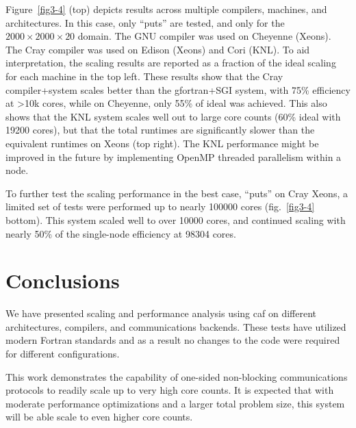 Figure~\ref{fig3-4} (top) depicts results across multiple compilers, machines, and architectures.
In this case, only ``puts'' are tested, and only for the $2000 \times 2000\times 20$ domain.
The GNU compiler was used on Cheyenne (Xeons). The Cray compiler was used on Edison (Xeons) and Cori (KNL).
To aid interpretation, the scaling results are reported as a fraction of the ideal scaling for each machine in the top left.
These results show that the Cray compiler+system scales better than the gfortran+SGI system,
with 75\% efficiency at >10k cores, while on Cheyenne, only 55\% of ideal was achieved.
This also shows that the KNL system scales well out to large core counts (60\% ideal with \num{19200} cores),
but that the total runtimes are significantly slower than the equivalent runtimes on Xeons (top right).
The KNL performance might be improved in the future by implementing OpenMP threaded parallelism within a node.

To further test the scaling performance in the best case, ``puts'' on Cray Xeons, a limited set of tests were performed up to nearly \num{100000} cores (fig.~\ref{fig3-4} bottom).
This system scaled well to over \num{10000} cores, and continued scaling with nearly 50\% of the single-node efficiency at \num{98304} cores.

\section{Conclusions}
We have presented scaling and performance analysis using \gls{caf} on different architectures, compilers, and communications backends.
These tests have utilized modern Fortran standards and as a result no changes to the code were required for different configurations.

This work demonstrates the capability of one-sided non-blocking communications protocols to readily scale up to very high core counts.
It is expected that with moderate performance optimizations and a larger total problem size, this system will be able scale to even higher core counts.





